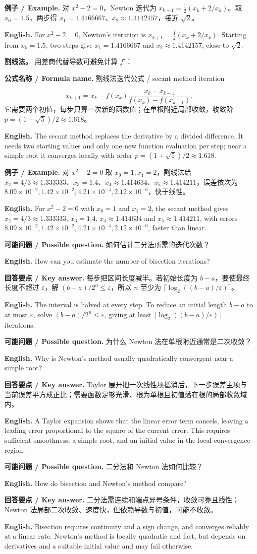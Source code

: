 \documentclass[UTF8,11pt,a4paper]{ctexart}
\newcommand{\EN}[1]{\par\noindent\textbf{English.} #1\par}
\newcommand{\FORMULA}[2]{\par\noindent\textbf{公式名称 / Formula name.} #1 / #2\par}
\newcommand{\EX}[2]{\par\noindent\textbf{例子 / Example.} #1\par\EN{#2}}
\newcommand{\ASK}[4]{\par\noindent\textbf{可能问题 / Possible question.} #1\par\EN{#2}\noindent\textbf{回答要点 / Key answer.} #3\par\EN{#4}\medskip}
\begin{document}
\EX{对 $x^2-2=0$，Newton 迭代为 $x_{k+1}=\tfrac12(x_k+2/x_k)$。取 $x_0=1.5$，两步得 $x_1=1.4166667$、$x_2\approx1.4142157$，接近 $\sqrt2$。}{For $x^2-2=0$, Newton's iteration is $x_{k+1}=\tfrac12(x_k+2/x_k)$. Starting from $x_0=1.5$, two steps give $x_1=1.4166667$ and $x_2\approx1.4142157$, close to $\sqrt2$.}

\noindent\textbf{割线法。} 用差商代替导数可避免计算 $f'$：
\FORMULA{割线法迭代公式}{secant method iteration}
\[
x_{k+1}=x_k-f(x_k)\frac{x_k-x_{k-1}}{f(x_k)-f(x_{k-1})}.
\]
它需要两个初值，每步只算一次新的函数值；在单根附近局部收敛，收敛阶 $p=(1+\sqrt5)/2\approx1.618$。
\EN{The secant method replaces the derivative by a divided difference. It needs two starting values and only one new function evaluation per step; near a simple root it converges locally with order $p=(1+\sqrt5)/2\approx1.618$.}
\EX{对 $x^2-2=0$ 取 $x_0=1,x_1=2$，割线法给 $x_2=4/3\approx1.333333$、$x_3=1.4$、$x_4\approx1.414634$、$x_5\approx1.414211$，误差依次为 $8.09\times10^{-2},1.42\times10^{-2},4.21\times10^{-4},2.12\times10^{-6}$，快于线性。}{For $x^2-2=0$ with $x_0=1$ and $x_1=2$, the secant method gives $x_2=4/3\approx1.333333$, $x_3=1.4$, $x_4\approx1.414634$ and $x_5\approx1.414211$, with errors $8.09\times10^{-2},1.42\times10^{-2},4.21\times10^{-4},2.12\times10^{-6}$, faster than linear.}

\ASK{如何估计二分法所需的迭代次数？}{How can you estimate the number of bisection iterations?}{每步把区间长度减半。若初始长度为 $b-a$，要使最终长度不超过 $\varepsilon$，解 $(b-a)/2^n\le\varepsilon$，所以 $n$ 至少为 $\lceil\log_2((b-a)/\varepsilon)\rceil$。}{The interval is halved at every step. To reduce an initial length $b-a$ to at most $\varepsilon$, solve $(b-a)/2^n\le\varepsilon$, giving at least $\lceil\log_2((b-a)/\varepsilon)\rceil$ iterations.}

\ASK{为什么 Newton 法在单根附近通常是二次收敛？}{Why is Newton's method usually quadratically convergent near a simple root?}{Taylor 展开把一次线性项抵消后，下一步误差主项与当前误差平方成正比；需要函数足够光滑、根为单根且初值落在根的局部收敛域内。}{A Taylor expansion shows that the linear error term cancels, leaving a leading error proportional to the square of the current error. This requires sufficient smoothness, a simple root, and an initial value in the local convergence region.}

\ASK{二分法和 Newton 法如何比较？}{How do bisection and Newton's method compare?}{二分法需连续和端点异号条件，收敛可靠且线性；Newton 法局部二次收敛、速度快，但依赖导数与初值，可能不收敛。}{Bisection requires continuity and a sign change, and converges reliably at a linear rate. Newton's method is locally quadratic and fast, but depends on derivatives and a suitable initial value and may fail otherwise.}
\end{document}
